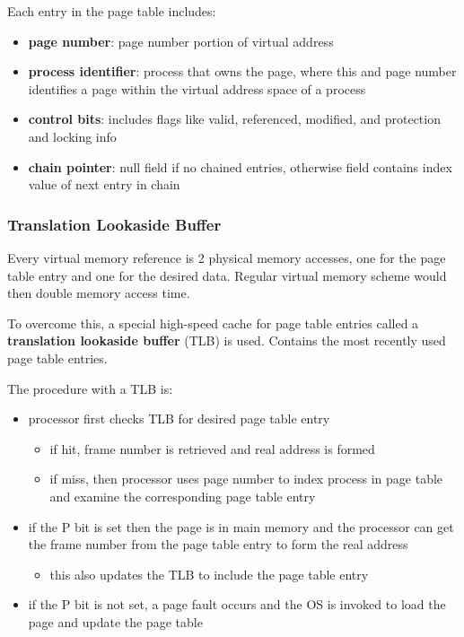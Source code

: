 \documentclass[11pt]{article}
\begin{document}
Each entry in the page table includes:
\begin{itemize}
\item \textbf{page number}: page number portion of virtual address
\item \textbf{process identifier}: process that owns the page, where this and page number
identifies a page within the virtual address space of a process
\item \textbf{control bits}: includes flags like valid, referenced, modified, and protection and
locking info
\item \textbf{chain pointer}: null field if no chained entries, otherwise field contains index
value of next entry in chain
\end{itemize}
\subsubsection{Translation Lookaside Buffer}
\label{sec:orgf0b6bea}
Every virtual memory reference is 2 physical memory accesses, one for the page table
entry and one for the desired data.
Regular virtual memory scheme would then double memory access time.

To overcome this, a special high-speed cache for page table entries called a
\textbf{translation lookaside buffer} (TLB) is used.
Contains the most recently used page table entries.

The procedure with a TLB is:
\begin{itemize}
\item processor first checks TLB for desired page table entry
\begin{itemize}
\item if hit, frame number is retrieved and real address is formed
\item if miss, then processor uses page number to index process in page table and
examine the corresponding page table entry
\end{itemize}
\item if the P bit is set then the page is in main memory and the processor can
get the frame number from the page table entry to form the real address
\begin{itemize}
\item this also updates the TLB to include the page table entry
\end{itemize}
\item if the P bit is not set, a page fault occurs and the OS is invoked to load the
page and update the page table
\end{itemize}
\end{document}
